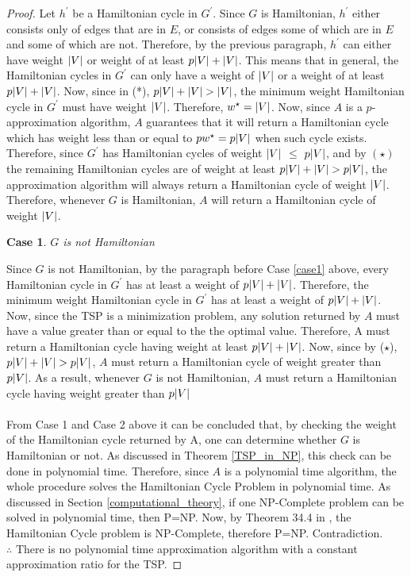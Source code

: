 \documentclass[12pt]{article}
\newtheorem{case}{Case}
\numberwithin{equation}{subsection}
\numberwithin{table}{subsection}
\numberwithin{algorithm}{subsection}
\numberwithin{figure}{subsection}
\begin{document}
\begin{proof}
Let $h^\prime$ be a Hamiltonian cycle in $G^\prime$. Since $G$ is Hamiltonian, $h^\prime$ either consists only of edges that are in $E$, or consists of edges some of which are in $E$ and some of which are not. Therefore, by the previous paragraph, $h^\prime$ can either have weight $\abs{V}$ or weight of at least $p\abs{V} + \abs{V}$. This means that in general, the Hamiltonian cycles in $G^\prime$ can only have a weight of $\abs{V}$ or a weight of at least $p\abs{V} + \abs{V}$. Now, since in (*), $p\abs{V} + \abs{V} > \abs{V}$, the minimum weight Hamiltonian cycle in $G^\prime$ must have weight $\abs{V}$. Therefore, $w^\star = \abs{V}$. Now, since $A$ is a $p$-approximation algorithm, $A$ guarantees that it will return a Hamiltonian cycle which has weight less than or equal to $pw^\star = p\abs{V}$ when such cycle exists. Therefore, since $G^\prime$ has Hamiltonian cycles of weight $\abs{V}$ $\leq$ $p\abs{V}$, and by $(\star)$ the remaining Hamiltonian cycles are of weight at least $ p\abs{V} + \abs{V} > p\abs{V}$, the approximation algorithm will always return a Hamiltonian cycle of weight $\abs{V}$. Therefore, whenever $G$ is Hamiltonian, $A$ will return a Hamiltonian cycle of weight $\abs{V}$.
\begin{case}
$G$ is not Hamiltonian
\end{case}
Since $G$ is not Hamiltonian, by the paragraph before Case \ref{case1} above, every Hamiltonian cycle in $G^\prime$ has at least a weight of $p\abs{V} + \abs{V}$. Therefore, the minimum weight Hamiltonian cycle in $G^\prime$ has at least a weight of $p\abs{V} + \abs{V}$. Now, since the TSP is a minimization problem, any solution returned by $A$ must have a value greater than or equal to the the optimal value. Therefore, A must return a Hamiltonian cycle having weight at least $p\abs{V} + \abs{V}$. Now, since by ($\star$), $p\abs{V} + \abs{V} > p\abs{V}$, $A$ must return a Hamiltonian cycle of weight greater than $p\abs{V}$. As a result, whenever $G$ is not Hamiltonian, $A$ must return a Hamiltonian cycle having weight greater than $p\abs{V}$ \\\\
From Case 1 and Case 2 above it can be concluded that, by checking the weight of the Hamiltonian cycle returned by A, one can determine whether $G$ is Hamiltonian or not. As discussed in Theorem \ref{TSP_in_NP}, this check can be done in polynomial time. Therefore, since $A$ is a polynomial time algorithm, the whole procedure solves the Hamiltonian Cycle Problem in polynomial time. As discussed in Section \ref{computational_theory}, if one NP-Complete problem can be solved in polynomial time, then P=NP. Now, by Theorem 34.4 in \cite{cormen_leiserson_rivest_stein}, the Hamiltonian Cycle problem is NP-Complete, therefore P=NP. Contradiction. \\
$\therefore$ There is no polynomial time approximation algorithm with a constant approximation ratio for the TSP.
\end{proof}
\end{document}
